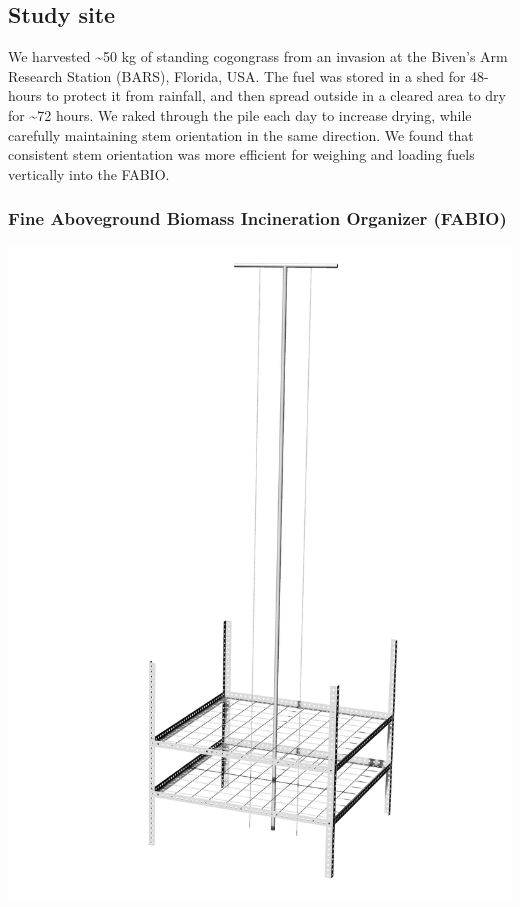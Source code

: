 \documentclass[11pt,a4paper]{article}
\begin{document}
\hypertarget{study-site}{%
\subsection{Study site}\label{study-site}}

We harvested \textasciitilde{}50 kg of standing cogongrass from an
invasion at the Biven's Arm Research Station (BARS), Florida, USA. The
fuel was stored in a shed for 48-hours to protect it from rainfall, and
then spread outside in a cleared area to dry for \textasciitilde{}72
hours. We raked through the pile each day to increase drying, while
carefully maintaining stem orientation in the same direction. We found
that consistent stem orientation was more efficient for weighing and
loading fuels vertically into the FABIO.

\hypertarget{fine-aboveground-biomass-incineration-organizer-fabio}{%
\subsubsection{Fine Aboveground Biomass Incineration Organizer
(FABIO)}\label{fine-aboveground-biomass-incineration-organizer-fabio}}

\includegraphics{figures/FABIOdraft.jpg}
\end{document}
